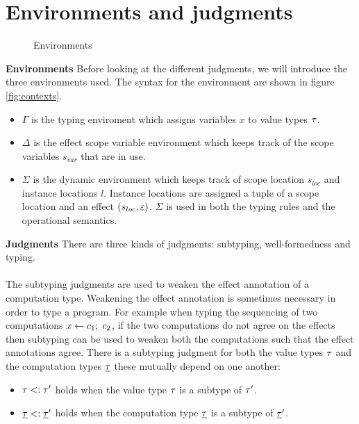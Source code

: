 {\section{Environments and judgments}
\label{sec:contexts}

\begin{figure}[h]
\caption{Environments}
\centering
{}
\end{figure}

\textbf{Environments}
Before looking at the different judgments, we will introduce the three environments used.
The syntax for the environment are shown in figure \ref{fig:contexts}.
\begin{itemize}
\item $\Gamma$ is the typing enviroment which assigns variables $x$ to value types $\tau$.
\item $\Delta$ is the effect scope variable environment which keeps track of the scope variables $s_{var}$ that are in use.
\item $\Sigma$ is the dynamic environment which keeps track of scope location $s_{loc}$ and instance locations $l$. Instance locations are assigned a tuple of a scope location and an effect $(s_{loc}, \varepsilon)$. $\Sigma$ is used in both the typing rules and the operational semantics.
\end{itemize}

\textbf{Judgments}
There are three kinds of judgments: subtyping, well-formedness and typing.
\\\\
The subtyping judgments are used to weaken the effect annotation of a computation type.
Weakening the effect annotation is sometimes necessary in order to type a program.
For example when typing the sequencing of two computations $x \leftarrow c_1 ;\; c_2$, if the two computations do not agree on the effects then subtyping can be used to weaken both the computations such that the effect annotations agree.
There is a subtyping judgment for both the value types $\tau$ and the computation types $\underline{\tau}$ these mutually depend on one another:
\begin{itemize}
\setlength\itemsep{0.5em}
\item $\tau <: \tau'$ holds when the value type $\tau$ is a subtype of $\tau'$.
\item $\underline{\tau} <: \underline{\tau}'$ holds when the computation type $\underline{\tau}$ is a subtype of $\underline{\tau}'$.
\end{itemize}

}
